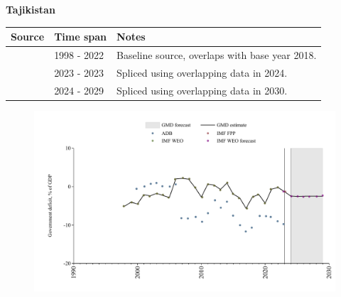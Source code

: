\documentclass[12pt,a4paper,landscape]{article}
\begin{document}
\begin{adjustbox}{max totalsize={\paperwidth}{\paperheight},center}
\begin{minipage}[t][\textheight][t]{\textwidth}
\vspace*{0.5cm}
{}
\begin{center}
{\Large\bfseries Tajikistan}
\end{center}
\vspace{0.5cm}
\begin{table}[H]
\centering
\small
\begin{tabular}{|l|l|l|}
\hline
\textbf{Source} & \textbf{Time span} & \textbf{Notes} \\
\hline
\rowcolor{white}\cite{IMF_WEO}& 1998 - 2022 &Baseline source, overlaps with base year 2018.\\
\rowcolor{lightgray}\cite{IMF_FPP}& 2023 - 2023 &Spliced using overlapping data in 2024.\\
\rowcolor{white}\cite{IMF_WEO_forecast}& 2024 - 2029 &Spliced using overlapping data in 2030.\\
\hline
\end{tabular}
\end{table}
\begin{figure}[H]
\centering
\includegraphics[width=\textwidth,height=0.6\textheight,keepaspectratio]{graphs/TJK_govdef_GDP.pdf}
\end{figure}
\end{minipage}
\end{adjustbox}
\end{document}
